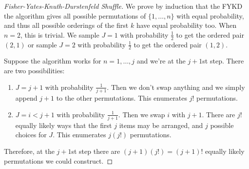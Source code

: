 \documentclass{beamer}
\begin{document}
\begin{frame}[label = fykd-proof]
\footnotesize
\begin{proof}[Fisher-Yates-Knuth-Durstenfeld Shuffle]
We prove by induction that the FYKD the algorithm gives all possible permutations of $\{1, \dots, n\}$ with equal probability, and thus all possible orderings of the first $k$ have equal probability too.
When $n=2$, this is trivial.  We sample $J=1$ with probability $\frac{1}{2}$ to get the ordered pair $(2, 1)$ or sample $J=2$ with probability $\frac{1}{2}$ to get the ordered pair $(1, 2)$. \\
\vspace{10pt}

Suppose the algorithm works for $n = 1, \dots, j$ and we're at the $j+1$st step.  There are two possibilities:
\begin{enumerate}
\item $J= j+1$ with probability $\frac{1}{j+1}$. Then we don't swap anything and we simply append $j+1$ to the other permutations.  This enumerates $j!$ permutations.
\item $J = i < j+1$ with probability $\frac{1}{j+1}$.  Then we swap $i$ with $j+1$.  There are $j!$ equally likely ways that the first $j$ items may be arranged, and $j$ possible choices for $J$.   This enumerates $j(j!)$ permutations.
\end{enumerate}

Therefore, at the $j+1$st step there are $(j+1)(j!) = (j+1)!$ equally likely permutations we could construct.
\end{proof}
\hyperlink{fykd}{}

\end{frame}
\end{document}
